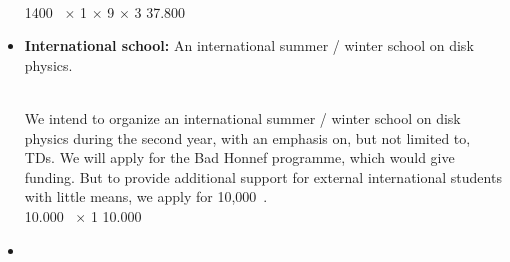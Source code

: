 \documentclass[10pt,fleqn,twoside]{article}
\begin{document}
\begin{itemize}
\vspace{0.2em}\\
1400~\EUR{} $\times$ 1 $\times$ 9 $\times$ 3    \hfill 37.800~\EUR{}\\
\item 
\begin{Emphasize}
{\bf International school:} An international summer / winter school on disk physics.
\end{Emphasize}\\
We intend to organize an international summer / winter school on disk physics
during the second year,
with an emphasis on, but not limited to, TDs. We will apply for the Bad Honnef
programme, which would give funding. But to provide additional support for
external international students with little means, we apply for 10,000~\EUR{}. 
\vspace{0.2em}\\
10.000~\EUR{} $\times$ 1              \hfill 10.000~\EUR{}\\
\item 

\end{itemize}
\end{document}
